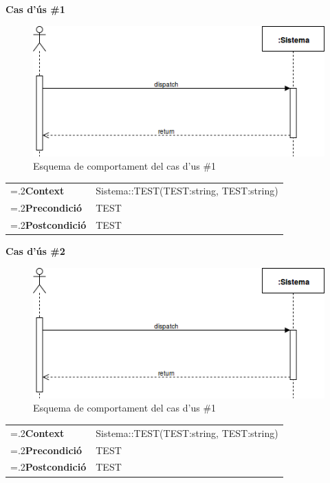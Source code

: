 \noindent\textbf{\large Cas d'ús \#1}\\
\begin{figure}[H]
\centering
\includegraphics[scale=0.6]{Figures/casdus_00.png}
\caption{Esquema de comportament del cas d'us \#1}
\end{figure}
\begin{table}[h]
\noindent
\begin{tabularx}{\linewidth}{
>{\hsize=.2\hsize}X%
>{\hsize=0.8\hsize}X%
}
\textbf{Context} 		& Sistema::TEST(TEST:string, TEST:string) \\
\textbf{Precondició} 	& TEST \\
\textbf{Postcondició}	& TEST \\
\end{tabularx}
\label{}
\end{table}

\noindent\textbf{\large Cas d'ús \#2}\\
\begin{figure}[H]
\centering
\includegraphics[scale=0.6]{Figures/casdus_00.png}
\caption{Esquema de comportament del cas d'us \#1}
\end{figure}
\begin{table}[h]
\noindent
\begin{tabularx}{\linewidth}{
>{\hsize=.2\hsize}X%
>{\hsize=0.8\hsize}X%
}
\textbf{Context} 		& Sistema::TEST(TEST:string, TEST:string) \\
\textbf{Precondició} 	& TEST \\
\textbf{Postcondició}	& TEST \\
\end{tabularx}
\label{}
\end{table}

